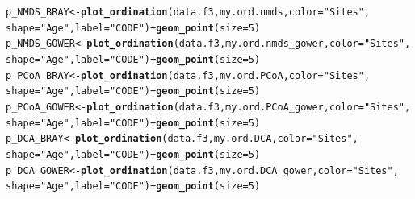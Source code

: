 \documentclass[12pt]{article}\usepackage[]{graphicx}\usepackage[]{color}
\makeatletter
\newcommand{\hlnum}[1]{\textcolor[rgb]{0.686,0.059,0.569}{#1}}%
\newcommand{\hlstr}[1]{\textcolor[rgb]{0.192,0.494,0.8}{#1}}%
\newcommand{\hlopt}[1]{\textcolor[rgb]{0,0,0}{#1}}%
\newcommand{\hlstd}[1]{\textcolor[rgb]{0.345,0.345,0.345}{#1}}%
\newcommand{\hlkwb}[1]{\textcolor[rgb]{0.69,0.353,0.396}{#1}}%
\newcommand{\hlkwc}[1]{\textcolor[rgb]{0.333,0.667,0.333}{#1}}%
\newcommand{\hlkwd}[1]{\textcolor[rgb]{0.737,0.353,0.396}{\textbf{#1}}}%
\newenvironment{kframe}{%
 \def\at@end@of@kframe{}%
 \ifinner\ifhmode%
  \def\at@end@of@kframe{\end{minipage}}%
  \begin{minipage}{\columnwidth}%
 \fi\fi%
 \def\FrameCommand##1{\hskip\@totalleftmargin \hskip-\fboxsep
 \colorbox{shadecolor}{##1}\hskip-\fboxsep
     \hskip-\linewidth \hskip-\@totalleftmargin \hskip\columnwidth}%
 \MakeFramed {\advance\hsize-\width
   \@totalleftmargin\z@ \linewidth\hsize
   \@setminipage}}%
 {\par\unskip\endMakeFramed%
 \at@end@of@kframe}
\newenvironment{knitrout}{}{} %
\numberwithin{figure}{section}
\makeatother
\begin{document}
\begin{knitrout}
\begin{kframe}
\begin{alltt}
\hlstd{p_NMDS_BRAY} \hlkwb{<-} \hlkwd{plot_ordination}\hlstd{(data.f3, my.ord.nmds,} \hlkwc{color} \hlstd{=} \hlstr{"Sites"}\hlstd{,}
                               \hlkwc{shape} \hlstd{=} \hlstr{"Age"}\hlstd{,} \hlkwc{label} \hlstd{=} \hlstr{"CODE"}\hlstd{)} \hlopt{+} \hlkwd{geom_point}\hlstd{(}\hlkwc{size} \hlstd{=} \hlnum{5}\hlstd{)}
\hlstd{p_NMDS_GOWER} \hlkwb{<-} \hlkwd{plot_ordination}\hlstd{(data.f3, my.ord.nmds_gower,} \hlkwc{color} \hlstd{=} \hlstr{"Sites"}\hlstd{,}
                                \hlkwc{shape} \hlstd{=} \hlstr{"Age"}\hlstd{,} \hlkwc{label} \hlstd{=} \hlstr{"CODE"}\hlstd{)} \hlopt{+} \hlkwd{geom_point}\hlstd{(}\hlkwc{size} \hlstd{=} \hlnum{5}\hlstd{)}
\hlstd{p_PCoA_BRAY} \hlkwb{<-} \hlkwd{plot_ordination}\hlstd{(data.f3, my.ord.PCoA,} \hlkwc{color} \hlstd{=} \hlstr{"Sites"}\hlstd{,}
                               \hlkwc{shape} \hlstd{=} \hlstr{"Age"}\hlstd{,} \hlkwc{label} \hlstd{=} \hlstr{"CODE"}\hlstd{)} \hlopt{+} \hlkwd{geom_point}\hlstd{(}\hlkwc{size} \hlstd{=} \hlnum{5}\hlstd{)}
\hlstd{p_PCoA_GOWER} \hlkwb{<-} \hlkwd{plot_ordination}\hlstd{(data.f3, my.ord.PCoA_gower,} \hlkwc{color} \hlstd{=} \hlstr{"Sites"}\hlstd{,}
                                \hlkwc{shape} \hlstd{=} \hlstr{"Age"}\hlstd{,} \hlkwc{label} \hlstd{=} \hlstr{"CODE"}\hlstd{)} \hlopt{+} \hlkwd{geom_point}\hlstd{(}\hlkwc{size} \hlstd{=} \hlnum{5}\hlstd{)}
\hlstd{p_DCA_BRAY} \hlkwb{<-} \hlkwd{plot_ordination}\hlstd{(data.f3, my.ord.DCA,} \hlkwc{color} \hlstd{=} \hlstr{"Sites"}\hlstd{,}
                              \hlkwc{shape} \hlstd{=} \hlstr{"Age"}\hlstd{,} \hlkwc{label} \hlstd{=} \hlstr{"CODE"}\hlstd{)} \hlopt{+} \hlkwd{geom_point}\hlstd{(}\hlkwc{size} \hlstd{=} \hlnum{5}\hlstd{)}
\hlstd{p_DCA_GOWER} \hlkwb{<-} \hlkwd{plot_ordination}\hlstd{(data.f3, my.ord.DCA_gower,} \hlkwc{color} \hlstd{=} \hlstr{"Sites"}\hlstd{,}
                               \hlkwc{shape} \hlstd{=} \hlstr{"Age"}\hlstd{,} \hlkwc{label} \hlstd{=} \hlstr{"CODE"}\hlstd{)} \hlopt{+} \hlkwd{geom_point}\hlstd{(}\hlkwc{size} \hlstd{=} \hlnum{5}\hlstd{)}
\end{alltt}
\end{kframe}
\end{knitrout}
\end{document}
